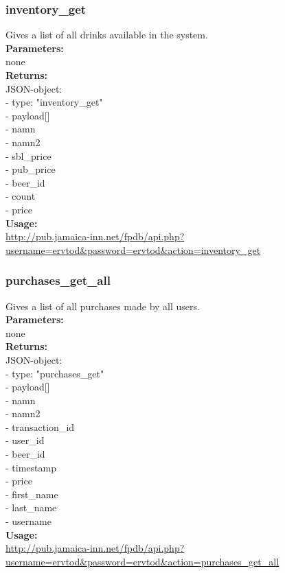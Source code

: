 \documentclass{article}
\begin{document}
\subsubsection{inventory\_get}
Gives a list of all drinks available in the system.\\
\textbf{Parameters:}\\
none\\
\textbf{Returns:}\\
JSON-object:\\
- type: "inventory\_get"\\
- payload[]\\
\indent - namn\\
\indent - namn2\\
\indent - sbl\_price\\
\indent - pub\_price\\
\indent - beer\_id\\
\indent - count\\
\indent - price\\
\textbf{Usage:}\\
\url{http://pub.jamaica-inn.net/fpdb/api.php?username=ervtod\&password=ervtod\&action=inventory\_get}\\

\subsubsection{purchases\_get\_all}
Gives a list of all purchases made by all users.\\
\textbf{Parameters:}\\
none\\
\textbf{Returns:}\\
JSON-object:\\
- type: "purchases\_get"\\
- payload[]\\
\indent - namn\\
\indent - namn2\\
\indent - transaction\_id\\
\indent - user\_id\\
\indent - beer\_id\\
\indent - timestamp\\
\indent - price\\
\indent - first\_name\\
\indent - last\_name\\
\indent - username\\
\textbf{Usage:}\\
\url{http://pub.jamaica-inn.net/fpdb/api.php?username=ervtod\&password=ervtod\&action=purchases\_get\_all}\\
\end{document}
